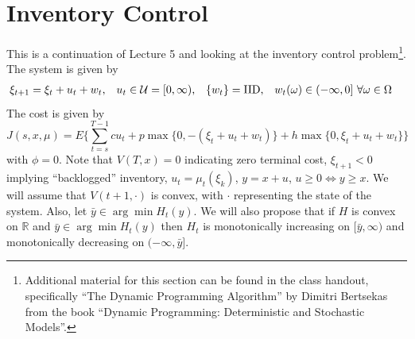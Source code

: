 % 
% 
%
%
% 
\mainmatter
\setcounter{page}{1}

\lectureseries[\course]{\course}

\date{October 15, 2009}

\setaddress

\setcounter{lecture}{5}
\setcounter{chapter}{5}


\section{Inventory Control}
This is a continuation of Lecture 5 and looking at the inventory control problem\footnote{Additional material for this section can be found in the class handout, specifically ``The Dynamic Programming Algorithm'' by Dimitri Bertsekas from the book ``Dynamic Programming: Deterministic and Stochastic Models''.}. The system is given by
\begin{align*}
\begin{split}
\xi_{t+1} &= \xi_t+u_t+w_t,
\end{split}
\begin{split}
u_t\in\mathcal{U}&=[0,\infty),
\end{split}
\begin{split}
\{w_t\} &= \text{IID},
\end{split}
\begin{split}
w_t(\omega) &\in (-\infty,0] ~\forall \omega\in\Omega
\end{split}
\end{align*}
The cost is given by
$$J(s,x,\mu) = E\{\sum_{t=s}^{T-1} cu_t + p\max\{0,-(\xi_t+u_t+w_t)\} + h\max\{0,\xi_t+u_t+w_t\}\}$$
with $\phi=0$. Note that $V(T,x)=0$ indicating zero terminal cost, $\xi_{t+1}<0$ implying ``backlogged'' inventory, $u_t=\mu_t(\xi_k)$, $y=x+u$, $u\geq 0\Leftrightarrow y\geq x$. We will assume that $V(t+1,\cdot)$ is convex, with $\cdot$ representing the state of the system. Also, let $\bar{y}\in\arg\min H_t(y)$. We will also propose that if $H$ is convex on $\mathbb{R}$ and $\bar{y}\in\arg\min H_t(y)$ then $H_t$ is monotonically increasing on $[\bar{y},\infty)$ and monotonically decreasing on $(-\infty,\bar{y}]$.


